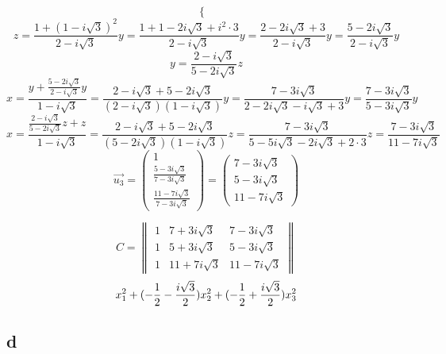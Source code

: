\begin{itemize}
$$\begin{cases}
    \end{cases} $$
    $$ z = \frac{1 + (1 - i\sqrt3)^2}{2 - i\sqrt3} y = \frac{1 + 1 - 2i\sqrt3 + i^2 \cdot 3}{2 - i\sqrt3} y = \frac{2 - 2i\sqrt3 + 3}{2 - i\sqrt3} y = \frac{5 - 2i\sqrt3}{2 - i\sqrt3} y $$
    $$ y = \frac{2 - i\sqrt3}{5 - 2i\sqrt3}z $$
    $$ x = \frac{y + \frac{5 - 2i\sqrt3}{2 - i\sqrt3}y}{1 - i\sqrt3} = \frac{2 - i\sqrt3 + 5 - 2i\sqrt3}{(2 - i\sqrt3)(1 - i\sqrt3)}y = \frac{7 - 3i\sqrt3}{2 - 2i\sqrt3 - i\sqrt3 + 3}y = \frac{7 - 3i\sqrt3}{5 - 3i\sqrt3}y $$
    $$ x = \frac{\frac{2 - i\sqrt3}{5 - 2i\sqrt3}z + z}{1 - i\sqrt3} = \frac{2 - i\sqrt3 + 5 - 2i\sqrt3}{(5 - 2i\sqrt3)(1 - i\sqrt3)}z = \frac{7 - 3i\sqrt3}{5 - 5i\sqrt3 - 2i\sqrt3 + 2 \cdot 3}z = \frac{7 - 3i\sqrt3}{11 - 7i\sqrt3} $$
    $$ \vec{u_3} =
    \begin{pmatrix}
    	1 \\
        \frac{5 - 3i\sqrt3}{7 - 3i\sqrt3} \\
        \frac{11 - 7i\sqrt3}{7 - 3i\sqrt3}
    \end{pmatrix} =
    \begin{pmatrix}
    	7 - 3i\sqrt3 \\
        5 - 3i\sqrt3 \\
        11 - 7i\sqrt3
    \end{pmatrix} $$
\end{itemize}
$$ C =
\begin{Vmatrix}
	1 & 7 + 3i\sqrt3 & 7 - 3i\sqrt3 \\
    1 & 5 + 3i\sqrt3 & 5 -3i\sqrt3 \\
    1 & 11 + 7i\sqrt3 & 11 - 7i\sqrt3
\end{Vmatrix} $$
$$ x_1^2 + (-\half - \half[i\sqrt3])x_2^2 + (-\half + \half[i\sqrt3])x_3^2 $$

\subsection{d}

